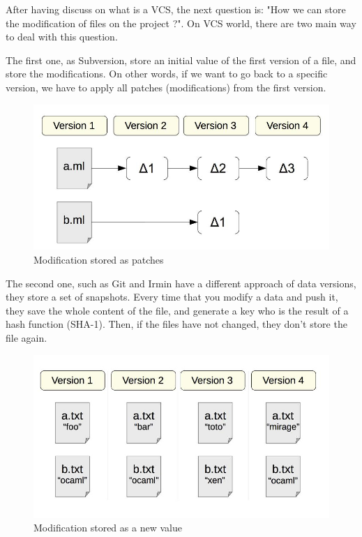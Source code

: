 \documentclass[10pt,a4paper]{report}
\begin{document}
After having discuss on what is a VCS, the next question is: "How we can store the modification of files on the project ?".
On VCS world, there are two main way to deal with this question. \newline

The first one, as Subversion, store an initial value of the first version of a file, and store the modifications.
On other words, if we want to go back to a specific version, we have to apply all patches (modifications) from the first version.\newline

\begin{figure}[H]
\centerline{\includegraphics[scale=0.5]{img/cvs-diff.jpg}}
\caption{Modification stored as patches}
\end{figure}

The second one, such as Git and Irmin have a different approach of data versions, they store a set of snapshots. 
Every time that you modify a data and push it, they save the whole content of the file, and generate a key who is the result of a hash function (SHA-1). Then, if the files have not changed, they don't store the file again.\newline

\begin{figure}[H]
\centerline{\includegraphics[scale=0.5]{img/cvs-nodiff.jpg}}
\caption{Modification stored as a new value}
\end{figure}
\end{document}
